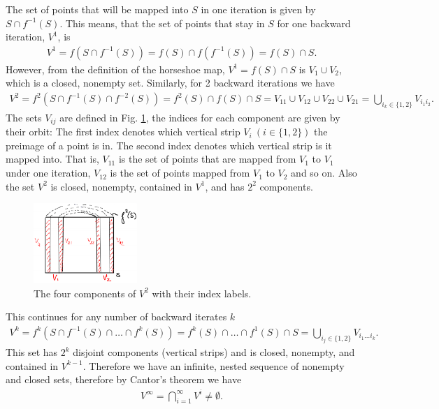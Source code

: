 The set of points that will be mapped into $S$ in one iteration is given by $S\cap f^{-1}(S)$. This means, that the set of points that stay in $S$ for one backward iteration, $V^1$, is
\begin{align}
V^1=f(S\cap f^{-1}(S)) = f(S)\cap f(f^{-1}(S)) = f(S)\cap S.
\end{align}
However, from the definition of the horseshoe map, $V^1 = f(S)\cap S$ is $V_1\cup V_2$, which is a closed, nonempty set. Similarly, for 2 backward iterations we have
\begin{align}
	V^{2} = f^{2}\left(S \cap f^{-1}(S) \cap f^{-2}(S) \right) = f^{2}(S) \cap f(S) \cap S  = V_{11} \cup V_{12} \cup V_{22} \cup V_{21} = \bigcup_{i_k \in \{1,2\}} V_{i_1i_2}.
\end{align}
The sets $V_{ij}$ are defined in Fig. \ref{fig:V_subsets}, the indices for each component are given by their orbit: The first index denotes which vertical strip $V_i\ (i\in \{1,2\})$ the preimage of a point is in. The second index denotes which vertical strip is it mapped into. That is, $V_{11}$ is the set of points that are mapped from $V_1$ to $V_1$ under one iteration, $V_{12}$ is the set of points mapped from $V_1$ to $V_2$ and so on. Also the set $V^{2}$ is closed, nonempty, contained in $V^{1}$, and has $2^2$ components.
\begin{figure}[h!]
	\centering
	\includegraphics[width=0.35\textwidth]{figures/ch6/18V_subsets.png}
	\caption{The four components of $V^{2}$ with their index labels.}
	\label{fig:V_subsets}
\end{figure}

This continues for any number of backward iterates $k$ 
\begin{align}
	V^{k} = f^{k}\left(S \cap f^{-1}(S) \cap \ldots \cap f^{k}(S)\right) = f^{k}(S) \cap \ldots \cap f^{1}(S) \cap S = \bigcup_{i_j \in \{1,2\}}V_{i_1 \ldots i_k}.
\end{align}
This set has $2^k$ disjoint components (vertical strips) and is closed, nonempty, and contained in $V^{k-1}$. Therefore we have an infinite, nested sequence of nonempty and closed sets, therefore by Cantor's theorem we have 
\begin{align}
\boxed{
	V^{\infty } = \bigcap_{i=1}^{\infty } V^{i} \neq \emptyset.
}
\end{align}

